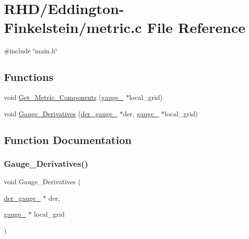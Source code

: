 \hypertarget{Eddington-Finkelstein_2metric_8c}{}\section{R\+H\+D/\+Eddington-\/\+Finkelstein/metric.c File Reference}
\label{Eddington-Finkelstein_2metric_8c}
{\ttfamily \#include \char`\"{}main.\+h\char`\"{}}\newline
\subsection*{Functions}
\begin{DoxyCompactItemize}
\item 
void \hyperlink{Eddington-Finkelstein_2metric_8c_a18642caac9855aeac797fbaba90b64d1}{Get\+\_\+\+Metric\+\_\+\+Components} (\hyperlink{structgauge__}{gauge\+\_\+} $\ast$local\+\_\+grid)
\item 
void \hyperlink{Eddington-Finkelstein_2metric_8c_afd567a147123bb7e7618da4b0263fefe}{Gauge\+\_\+\+Derivatives} (\hyperlink{structder__gauge__}{der\+\_\+gauge\+\_\+} $\ast$der, \hyperlink{structgauge__}{gauge\+\_\+} $\ast$local\+\_\+grid)
\end{DoxyCompactItemize}


\subsection{Function Documentation}
\mbox{\label{Eddington-Finkelstein_2metric_8c_afd567a147123bb7e7618da4b0263fefe}} 
\subsubsection{\texorpdfstring{Gauge\+\_\+\+Derivatives()}{Gauge\_Derivatives()}}
{\footnotesize\ttfamily void Gauge\+\_\+\+Derivatives (\begin{DoxyParamCaption}\item[{\hyperlink{structder__gauge__}{der\+\_\+gauge\+\_\+} $\ast$}]{der,  }\item[{\hyperlink{structgauge__}{gauge\+\_\+} $\ast$}]{local\+\_\+grid }\end{DoxyParamCaption})}

